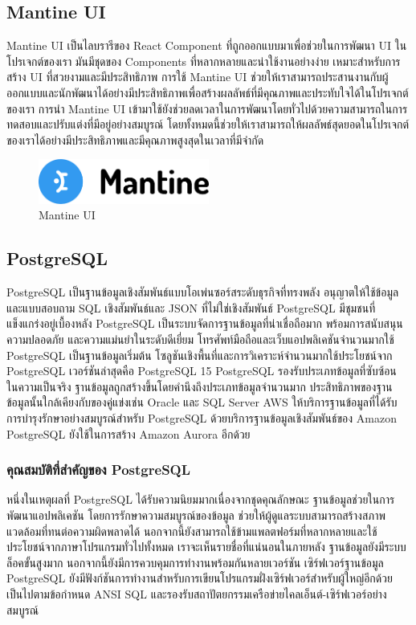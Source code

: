\subsection{Mantine UI}
Mantine UI \cite{web:mantine} เป็นไลบรารีของ React Component ที่ถูกออกแบบมาเพื่อช่วยในการพัฒนา UI ในโปรเจกต์ของเรา มันมีชุดของ Components ที่หลากหลายและน่าใช้งานอย่างง่าย เหมาะสำหรับการสร้าง UI ที่สวยงามและมีประสิทธิภาพ การใช้ Mantine UI ช่วยให้เราสามารถประสานงานกับผู้ออกแบบและนักพัฒนาได้อย่างมีประสิทธิภาพเพื่อสร้างผลลัพธ์ที่มีคุณภาพและประทับใจได้ในโปรเจกต์ของเรา การนำ Mantine UI เข้ามาใช้ยังช่วยลดเวลาในการพัฒนาโดยทั่วไปด้วยความสามารถในการทดสอบและปรับแต่งที่มีอยู่อย่างสมบูรณ์ โดยทั้งหมดนี้ช่วยให้เราสามารถให้ผลลัพธ์สุดยอดในโปรเจกต์ของเราได้อย่างมีประสิทธิภาพและมีคุณภาพสูงสุดในเวลาที่มีจำกัด
\begin{figure}
    \centering
    \includegraphics[width=0.5\textwidth]{img/mantine.png}
    \caption{Mantine UI}
    \label{fig:mantine}
\end{figure}

\subsection{PostgreSQL}
PostgreSQL \cite{web:postgresql} เป็นฐานข้อมูลเชิงสัมพันธ์แบบโอเพ่นซอร์สระดับธุรกิจที่ทรงพลัง อนุญาตให้ใช้ข้อมูลและแบบสอบถาม SQL เชิงสัมพันธ์และ JSON ที่ไม่ใช่เชิงสัมพันธ์ PostgreSQL มีชุมชนที่แข็งแกร่งอยู่เบื้องหลัง PostgreSQL เป็นระบบจัดการฐานข้อมูลที่น่าเชื่อถือมาก พร้อมการสนับสนุน ความปลอดภัย และความแม่นยำในระดับดีเยี่ยม โทรศัพท์มือถือและเว็บแอปพลิเคชันจำนวนมากใช้ PostgreSQL เป็นฐานข้อมูลเริ่มต้น โซลูชันเชิงพื้นที่และการวิเคราะห์จำนวนมากใช้ประโยชน์จาก PostgreSQL เวอร์ชันล่าสุดคือ PostgreSQL 15 PostgreSQL รองรับประเภทข้อมูลที่ซับซ้อน ในความเป็นจริง ฐานข้อมูลถูกสร้างขึ้นโดยคำนึงถึงประเภทข้อมูลจำนวนมาก ประสิทธิภาพของฐานข้อมูลนั้นใกล้เคียงกับของคู่แข่งเช่น Oracle และ SQL Server AWS ให้บริการฐานข้อมูลที่ได้รับการบำรุงรักษาอย่างสมบูรณ์สำหรับ PostgreSQL ด้วยบริการฐานข้อมูลเชิงสัมพันธ์ของ Amazon PostgreSQL ยังใช้ในการสร้าง Amazon Aurora อีกด้วย
\subsubsection{คุณสมบัติที่สำคัญของ PostgreSQL}
หนึ่งในเหตุผลที่ PostgreSQL ได้รับความนิยมมากเนื่องจากชุดคุณลักษณะ ฐานข้อมูลช่วยในการ พัฒนาแอปพลิเคชัน โดยการรักษาความสมบูรณ์ของข้อมูล ช่วยให้ผู้ดูแลระบบสามารถสร้างสภาพแวดล้อมที่ทนต่อความผิดพลาดได้ นอกจากนี้ยังสามารถใช้ข้ามแพลตฟอร์มที่หลากหลายและใช้ประโยชน์จากภาษาโปรแกรมทั่วไปทั้งหมด เราจะเห็นรายชื่อที่แน่นอนในภายหลัง
ฐานข้อมูลยังมีระบบล็อคขั้นสูงมาก นอกจากนี้ยังมีการควบคุมการทำงานพร้อมกันหลายเวอร์ชัน เซิร์ฟเวอร์ฐานข้อมูล PostgreSQL ยังมีฟังก์ชันการทำงานสำหรับการเขียนโปรแกรมฝั่งเซิร์ฟเวอร์สำหรับผู้ใหญ่อีกด้วย เป็นไปตามข้อกำหนด ANSI SQL และรองรับสถาปัตยกรรมเครือข่ายไคลเอ็นต์-เซิร์ฟเวอร์อย่างสมบูรณ์


